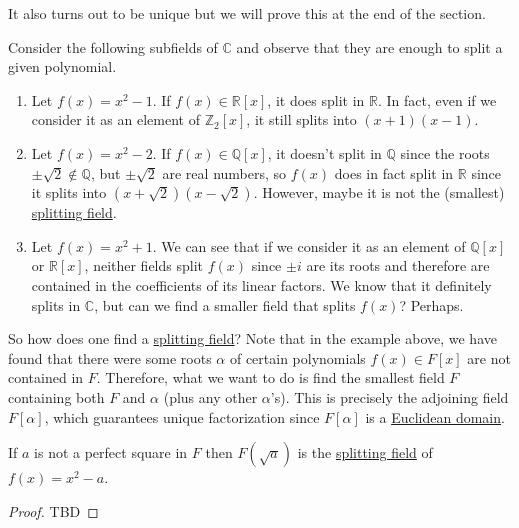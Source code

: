   It also turns out to be unique but we will prove this at the end of the section. 

  \begin{example}
    \label{ex:dont-need-necessarily-complex-numbers-to-split}
    Consider the following subfields of $\mathbb{C}$ and observe that they are enough to split a given polynomial. 
    \begin{enumerate}
      \item Let $f(x) = x^2 - 1$. If $f(x) \in \mathbb{R}[x]$, it does split in $\mathbb{R}$. In fact, even if we consider it as an element of $\mathbb{Z}_2 [x]$, it still splits into $(x + 1)(x - 1)$. 
      \item Let $f(x) = x^2 - 2$. If $f(x) \in \mathbb{Q}[x]$, it doesn't split in $\mathbb{Q}$ since the roots $\pm \sqrt{2} \not\in \mathbb{Q}$, but $\pm \sqrt{2}$ are real numbers, so $f(x)$ does in fact split in $\mathbb{R}$ since it splits into $(x + \sqrt{2}) (x - \sqrt{2})$. However, maybe it is not the (smallest) \hyperref[def:splitting-field]{splitting field}. 
      \item Let $f(x) = x^2 + 1$. We can see that if we consider it as an element of $\mathbb{Q}[x]$ or $\mathbb{R}[x]$, neither fields split $f(x)$ since $\pm i$ are its roots and therefore are contained in the coefficients of its linear factors. We know that it definitely splits in $\mathbb{C}$, but can we find a smaller field that splits $f(x)$? Perhaps.  
    \end{enumerate}
  \end{example}

  So how does one find a \hyperref[def:splitting-field]{splitting field}? Note that in the example above, we have found that there were some roots $\alpha$ of certain polynomials $f(x) \in F[x]$ are not contained in $F$. Therefore, what we want to do is find the smallest field $F$ containing both $F$ and $\alpha$ (plus any other $\alpha$'s). This is precisely the adjoining field $F[\alpha]$, which guarantees unique factorization since $F[\alpha]$ is a \hyperref[def:euclidean-domain]{Euclidean domain}. 

  \begin{lemma}
    \label{thm:square-free-extensions-as-splitting-field}
    If $a$ is not a perfect square in $F$ then $F(\sqrt{a})$ is the \hyperref[def:splitting-field]{splitting field} of $f(x) = x^2 - a$. 
  \end{lemma}
  \begin{proof}
    TBD
  \end{proof}

